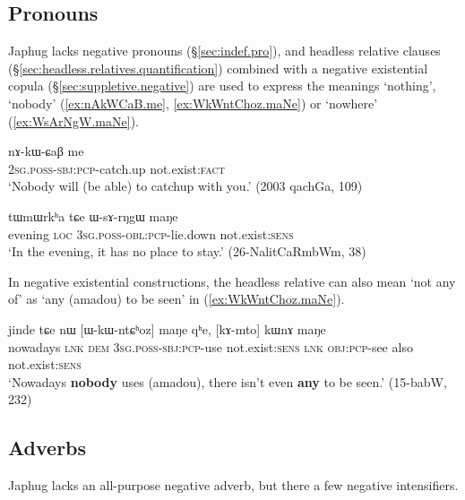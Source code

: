 

\subsection{Pronouns} \label{sec:negative.pronoun}
Japhug lacks negative pronouns (§\ref{sec:indef.pro}), and headless relative clauses (§\ref{sec:headless.relatives.quantification}) combined with a negative existential copula (§\ref{sec:suppletive.negative})  are used to express the meanings `nothing', `nobody' (\ref{ex:nAkWCaB.me}, \ref{ex:WkWntChoz.maNe}) or `nowhere' (\ref{ex:WsArNgW.maNe}).

\begin{exe}
	\ex \label{ex:nAkWCaB.me}
	\gll nɤ-kɯ-ɕaβ me \\
	\textsc{2sg}.\textsc{poss}-\textsc{sbj}:\textsc{pcp}-catch.up not.exist:\textsc{fact} \\
	\glt `Nobody will (be able) to catchup with you.' (2003 qachGa, 109)
\end{exe}

\begin{exe}
	\ex \label{ex:WsArNgW.maNe}
	\gll tɯmɯrkʰa tɕe ɯ-sɤ-rŋgɯ maŋe \\
	evening \textsc{loc} \textsc{3sg}.\textsc{poss}-\textsc{obl}:\textsc{pcp}-lie.down not.exist:\textsc{sens} \\
	\glt `In the evening, it has no place to stay.' (26-NalitCaRmbWm, 38)
\end{exe}

In negative existential constructions, the headless relative can also mean `not any of' as  `any (amadou) to be seen' in (\ref{ex:WkWntChoz.maNe}).

\begin{exe}
	\ex \label{ex:WkWntChoz.maNe}
	\gll jinde tɕe nɯ [ɯ-kɯ-ntɕʰoz] maŋe qʰe, [kɤ-mto] kɯnɤ maŋe \\
	nowadays \textsc{lnk} \textsc{dem} \textsc{3sg}.\textsc{poss}-\textsc{sbj}:\textsc{pcp}-use not.exist:\textsc{sens} \textsc{lnk} \textsc{obj}:\textsc{pcp}-see also not.exist:\textsc{sens} \\
	\glt `Nowadays \textbf{nobody} uses (amadou), there isn't even \textbf{any} to be seen.' (15-babW, 232)
\end{exe}

\subsection{Adverbs} \label{sec:negative.adverbs}
Japhug lacks an all-purpose negative adverb, but there a few negative intensifiers.

